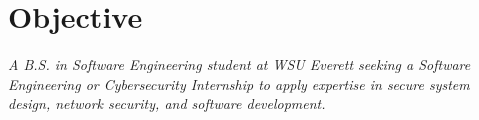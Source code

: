 \section{Objective}
\textit{A B.S. in Software Engineering student at WSU Everett seeking a Software Engineering or Cybersecurity Internship to apply expertise in secure system design, network security, and software development. \\}
